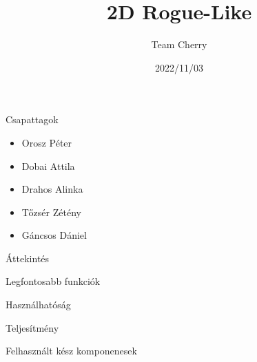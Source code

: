 \documentclass[14pt, aspectratio=169]{beamer}
\title{2D Rogue-Like}
\author{Team Cherry}
\date{2022/11/03}
\begin{document}
	\maketitle
	\begin{frame}{Csapattagok}
		\begin{itemize}
			\item Orosz Péter
			\item Dobai Attila
			\item Drahos Alinka
			\item Tőzsér Zétény
			\item Gáncsos Dániel
		\end{itemize}
	\end{frame}
	
	\begin{frame}{Áttekintés}
		\begin{block}{Legfontosabb funkciók}\end{block}
		\begin{block}{Használhatóság}\end{block}
		\begin{block}{Teljesítmény}\end{block}
		\begin{block}{Felhasznált kész komponenesek}\end{block}
	\end{frame}
		
\end{document}

